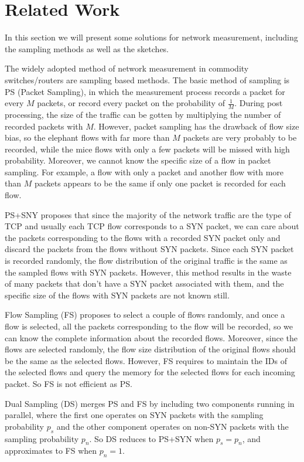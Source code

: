 \section{Related Work}
\label{section:relatedwork}
In this section we will present some solutions for network measurement, including the sampling methods as well as the sketches.

The widely adopted method of network measurement in commodity switches/routers are sampling based methods. The basic method of sampling is PS (Packet Sampling), in which the measurement process records a packet for every $M$ packets, or record every packet on the probability of $\frac{1}{M}$. During post processing, the size of the traffic can be gotten by multiplying the number of recorded packets with $M$. However, packet sampling has the drawback of flow size bias, so the elephant flows with far more than $M$ packets are very probably to be recorded, while the mice flows with only a few packets will be missed with high probability. Moreover, we cannot know the specific size of a flow in packet sampling. For example, a flow with only a packet and another flow with more than $M$ packets appears to be the same if only one packet is recorded for each flow. 

PS+SNY\cite{duffield_estimating_2005} proposes that since the majority of the network traffic are the type of TCP and usually each TCP flow corresponds to a SYN packet, we can care about the packets corresponding to the flows with a recorded SYN packet only and discard the packets from the flows without SYN packets. Since each SYN packet is recorded randomly, the flow distribution of the original traffic is the same as the sampled flows with SYN packets. However, this method results in the waste of many packets that don't have a SYN packet associated with them, and the specific size of the flows with SYN packets are not known still. 

Flow Sampling (FS)\cite{hohn_inverting_2003} proposes to select a couple of flows randomly, and once a flow is selected, all the packets corresponding to the flow will be recorded, so we can know the complete information about the recorded flows. Moreover, since the flows are selected randomly, the flow size distribution of the original flows should be the same as the selected flows. However, FS requires to maintain the IDs of the selected flows and query the memory for the selected flows for each incoming packet. So FS is not efficient as PS. 

Dual Sampling (DS)\cite{tune_towards_2008} merges PS and FS by including two components running in parallel, where the first one operates on SYN packets with the sampling probability $p_s$ and the other component operates on non-SYN packets with the sampling probability $p_n$. So DS reduces to PS+SYN when $p_s = p_n$, and approximates to FS when $p_n=1$. 

